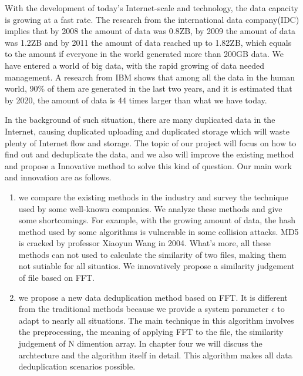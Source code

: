 
\begin{englishabstract}

    With the development of today's Internet-scale and technology, the data capacity is growing at a fast rate. The research from the international data company(IDC) implies that by 2008 the amount of data was 0.8ZB, by 2009 the amount of data was 1.2ZB and by 2011 the amount of data reached up to 1.82ZB, which equals to the amount if everyone in the world generated more than 200GB data. We have entered a world of big data, with the rapid growing of data needed management. A research from IBM shows that among all the data in the human world, 90\% of them are generated in the last two years, and it is estimated that by 2020, the amount of data is 44 times larger than what we have today.

    In the background of such situation, there are many duplicated data in the Internet, causing duplicated uploading and duplicated storage which will waste plenty of Internet flow and storage. The topic of our project will focus on how to find out and deduplicate the data, and we also will improve the existing method and propose a Innovative method to solve this kind of question. Our main work and innovation are as follows.

\begin{enumerate}
    \item we compare the existing methods in the industry and survey the technique used by some well-known companies. We analyze these methods and give some shortcomings. For example, with the growing amount of data, the hash method used by some algorithms is vulnerable in some collision attacks. MD5 is cracked by professor Xiaoyun Wang in 2004. What's more, all these methods can not used to calculate the similarity of two files, making them not sutiable for all situatios. We innovatively propose a similarity judgement of file based on FFT.

    \item we propose a new data deduplication method based on FFT. It is different from the traditional methods because we provide a system parameter $\epsilon$ to adapt to nearly all situations. The main technique in this algorithm involves the preprocessing, the meaning of applying FFT to the file, the similarity judgement of N dimention array. In chapter four we will discuss the archtecture and the algorithm itself in detail. This algorithm makes all data deduplication scenarios possible.


\end{enumerate}
\end{englishabstract}
